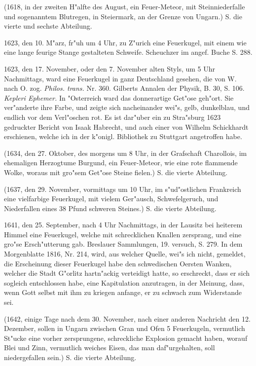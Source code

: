 \documentclass[a4paper, 11pt, oneside, polutonikogreek, german]{article}
\begin{document}
(1618, in der zweiten H"alfte des August, ein Feuer-Meteor, mit Steinniederfalle und sogenanntem Blutregen, in Steiermark, an der Grenze von Ungarn.) S. die vierte und sechste Abteilung.

1623, den 10. M"arz, fr"uh um 4 Uhr, zu Z"urich eine Feuerkugel, mit einem wie eine lange feurige Stange gestalteten Schweife. Scheuchzer im angef. Buche S. 288.

1623, den 17. November, oder den 7. November alten Styls, um 5 Uhr Nachmittags, ward eine Feuerkugel in ganz Deutschland gesehen, die von W. nach O. zog. \emph{Philos. trans.} Nr. 360. Gilberts Annalen der Physik, B. 30, S. 106. \emph{Kepleri Ephemer.} In "Osterreich ward das donnerartige Get"ose geh"ort. Sie ver"anderte ihre Farbe, und zeigte sich nacheinander wei"s, gelb, dunkelblau, und endlich vor dem Verl"oschen rot. Es ist dar"uber ein zu Stra"sburg 1623 gedruckter Bericht von Isaak Habrecht, und auch einer von Wilhelm Schickhardt erschienen, welche ich in der k"onigl. Bibliothek zu Stuttgart angetroffen habe.

(1634, den 27. Oktober, des morgens um 8 Uhr, in der Grafschaft Charollois, im ehemaligen Herzogtume Burgund, ein Feuer-Meteor, wie eine rote flammende Wolke, woraus mit gro"sem Get"ose Steine fielen.) S. die vierte Abteilung.

(1637, den 29. November, vormittags um 10 Uhr, im s"ud"ostlichen Frankreich eine vielfarbige Feuerkugel, mit vielem Ger"ausch, Schwefelgeruch, und Niederfallen eines 38 Pfund schweren Steines.) S. die vierte Abteilung.

1641, den 25. September, nach 4 Uhr Nachmittags, in der Lausitz bei heiterem Himmel eine Feuerkugel, welche mit schrecklichen Knallen zersprang, und eine gro"se Ersch"utterung gab. Breslauer Sammlungen, 19. versuch, S. 279. In dem Morgenblatte 1816, Nr. 214, wird, aus welcher Quelle, wei"s ich nicht, gemeldet, die Erscheinung dieser Feuerkugel habe den schwedischen Oersten Wanken, welcher die Stadt G"orlitz hartn"ackig verteidigt hatte, so erschreckt, dass er sich sogleich entschlossen habe, eine Kapitulation anzutragen, in der Meinung, dass, wenn Gott selbst mit ihm zu kriegen anfange, er zu schwach zum Widerstande sei.

(1642, einige Tage nach dem 30. November, nach einer anderen Nachricht den 12. Dezember, sollen in Ungarn zwischen Gran und Ofen 5 Feuerkugeln, vermutlich St"ucke eine vorher zersprungene, schreckliche Explosion gemacht haben, worauf Blei und Zinn, vermutlich weiches Eisen, das man daf"urgehalten, soll niedergefallen sein.) S. die vierte Abteilung.
\end{document}

